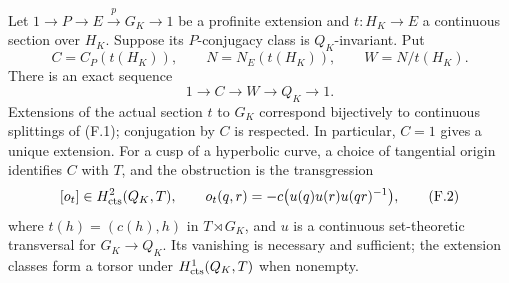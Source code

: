\begin{proposition}
\label{F-descent-obstruction}
Let $1\to P\to E\xrightarrow{p}G_K\to1$ be a profinite
extension and $t:H_K\to E$ a continuous section over $H_K$.
Suppose its $P$-conjugacy class is $Q_K$-invariant. Put
\[
 C=C_P(t(H_K)),\qquad N=N_E(t(H_K)),\qquad W=N/t(H_K).
\]
There is an exact sequence
\[
 1\longrightarrow C\longrightarrow W\longrightarrow Q_K
       \longrightarrow1.                                      \tag{F.1}
\]
Extensions of the actual section $t$ to $G_K$ correspond bijectively
to continuous splittings of (F.1); conjugation by $C$ is respected.
In particular, $C=1$ gives a unique extension. For a cusp of a
hyperbolic curve, a choice of tangential origin identifies $C$ with
$T$, and the obstruction is the transgression
\[
 [o_t]\in H^2_{\rm cts}(Q_K,T),\qquad
 o_t(q,r)=-c\bigl(u(q)u(r)u(qr)^{-1}\bigr),                    \tag{F.2}
\]
where $t(h)=(c(h),h)$ in $T\rtimes G_K$, and $u$ is a continuous
set-theoretic transversal for $G_K\to Q_K$. Its vanishing is
necessary and sufficient; the extension classes form a torsor
under $H^1_{\rm cts}(Q_K,T)$ when nonempty.
\end{proposition}
